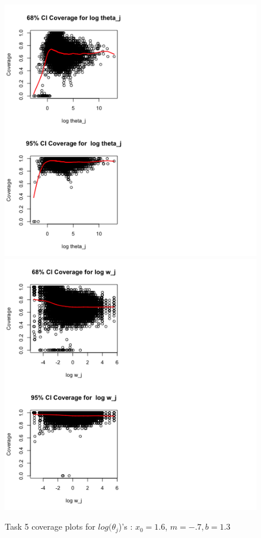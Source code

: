\documentclass[paper=a4, fontsize=11pt]{scrartcl}
\begin{document}
\begin{figure}[h!]
  \caption{Task 5 coverage plots for $log(\theta_{j}$)'s : $x_0 = 1.6$, $m = -.7, b = 1.3$}
  \centering
	\includegraphics[scale=1, trim = 80 0 150 0]{keskici_wxiao_ps2_task5_plot5.png}
		\includegraphics[scale=1, trim = 100 0 300 0]{keskici_wxiao_ps2_task5_plot6.png}
\end{figure}
\end{document}
